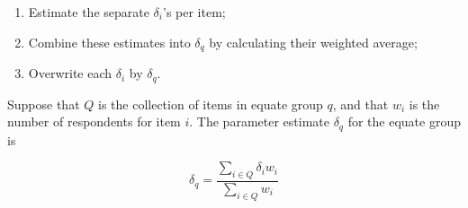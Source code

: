 \documentclass[
]{book}
\providecommand{\tightlist}{%
  \setlength{\itemsep}{0pt}\setlength{\parskip}{0pt}}
\begin{document}
\begin{enumerate}
\def\labelenumi{\arabic{enumi}.}
\tightlist
\item
  Estimate the separate \(\delta_i\)'s per item;
\item
  Combine these estimates into \(\delta_q\) by calculating their weighted average;
\item
  Overwrite each \(\delta_i\) by \(\delta_q\).
\end{enumerate}

Suppose that \(Q\) is the collection of items in equate group \(q\), and that \(w_i\) is the number of respondents for item \(i\). The parameter estimate \(\delta_q\) for the equate group is

\begin{equation}
\delta_q = \frac{\sum_{i\in Q} \delta_iw_i}{\sum_{i\in Q} w_i} \label{eq:raschequate}
\end{equation}
\end{document}
